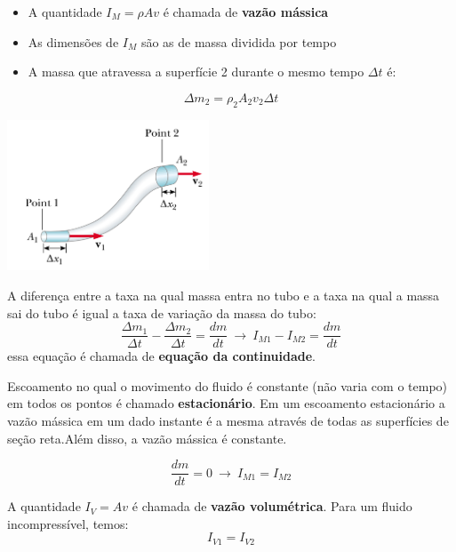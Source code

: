 \documentclass[t,%
brazilian,%
11pt,%
aspectratio=169,%
table%
]{beamer}
\begin{document}
\begin{frame}
    \begin{itemize}
        \item A quantidade $I_M=\rho A v$ é chamada de \textbf{vazão mássica}
        \item As dimensões de $I_M$ são as de massa dividida por tempo
        \item A massa que atravessa a superfície 2 durante o mesmo tempo $\Delta t$ é:
    \end{itemize}
    \[
        \Delta m_2 = \rho_2 A_2 v_2 \Delta t
    \]
    \begin{center}
        \includegraphics[width=0.45\textwidth]{images/tuboS}
    \end{center}
\end{frame}

\begin{frame}[c]
    A diferença entre a taxa na qual massa entra no tubo e a taxa na qual a massa
    sai do tubo é igual a taxa de variação da massa do tubo:
    \[
        \frac{\Delta m_1}{\Delta t} - \frac{\Delta m_2}{\Delta t} = \frac{dm}{dt} ~\rightarrow~ I_{M1}-I_{M2} = \frac{dm}{dt}
    \]
    essa equação é chamada de \textbf{equação da continuidade}.
\end{frame}

\begin{frame}
    Escoamento no qual o movimento do fluido é constante (não varia com o tempo) em
    todos os pontos é chamado \textbf{estacionário}. Em um escoamento estacionário
    a vazão mássica em um dado instante é a mesma através de todas as superfícies
    de seção reta.Além disso, a vazão mássica é constante.

    \[
        \frac{dm}{dt}=0 ~\rightarrow~ I_{M1}=I_{M2}
    \]

    A quantidade $I_V = Av$ é chamada de \textbf{vazão volumétrica}. Para um fluido incompressível, temos:
    \[
        I_{V1}=I_{V2}
    \]
\end{frame}

\end{document}
